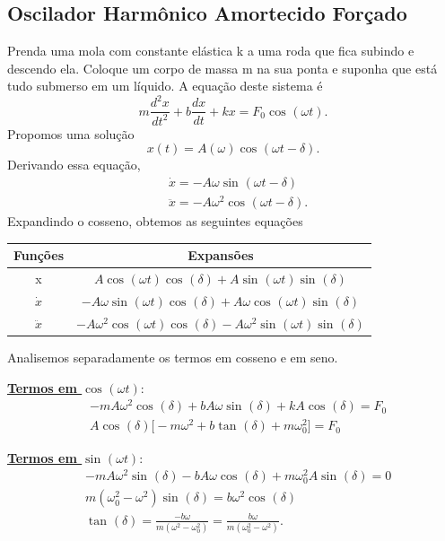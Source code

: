 \documentclass{article}
\begin{document}
\subsection{Oscilador Harmônico Amortecido Forçado}
Prenda uma mola com constante elástica k a uma roda que fica subindo e descendo ela. Coloque um corpo de massa m na sua ponta e 
suponha que está tudo submerso em um líquido. A equação deste sistema é 
\[
  m \frac{d^{2}x}{dt^{2}} + b \frac{dx}{dt} + kx = F_{0}\cos^{}{(\omega t)}.
\]
Propomos uma solução 
\[
  x(t) = A(\omega ) \cos^{}{(\omega t - \delta )}.
\]
Derivando essa equação, 
\begin{align*}
   &\dot x = -A\omega \sin^{}{(\omega t - \delta )}\\
   &\ddot x = -A\omega ^{2}\cos^{}{(\omega t - \delta )}.
\end{align*}
Expandindo o cosseno, obtemos as seguintes equações
\begin{center}
  \begin{table}[h]
    \centering
    \begin{tabular}{| c | c |}
      \hline 
      Funções & Expansões\\
      \hline
      x & \(A\cos^{}{(\omega t )}\cos^{}{(\delta )} + A \sin^{}{(\omega t)}\sin^{}{(\delta )}\)\\
      \(\dot x\) & \(-A\omega \sin^{}{(\omega t)}\cos^{}{(\delta )} + A\omega \cos^{}{(\omega t)}\sin^{}{(\delta )}\)\\
      \(\ddot x\) & \(-A\omega^{2}\cos^{}{(\omega t)}\cos^{}{(\delta )} - A\omega ^{2}\sin^{}{(\omega t)}\sin^{}{(\delta )}\)\\
      \hline
    \end{tabular}
  \end{table}
\end{center}

Analisemos separadamente os termos em cosseno e em seno.

\underline{\textbf{Termos em \(\cos^{}{(\omega t)}\)}}:
\begin{align*}
  &-mA\omega ^{2}\cos^{}{(\delta )} + b A\omega \sin^{}{(\delta )} + kA \cos^{}{(\delta )} = F_{0}\\
  &A\cos^{}{(\delta )}\biggl[-m\omega ^{2} + b \tan^{}{(\delta )} + m\omega_{0}^{2}\biggr] = F_{0}
\end{align*}

\underline{\textbf{Termos em \(\sin^{}{(\omega t)}\)}}:
\begin{align*}
  &-mA\omega ^{2}\sin^{}{(\delta )} - bA\omega\cos^{}{(\delta )} + m\omega_{0}^{2}A\sin^{}{(\delta )} = 0\\
  &m(\omega_{0}^{2}-\omega ^{2})\sin^{}{(\delta )}=b\omega^{2}\cos^{}{(\delta )}\\
  &\tan^{}{(\delta )}=\frac{-b\omega}{m(\omega ^{2}-\omega_{0}^{2})} = \frac{b\omega}{m(\omega_{0}^{2}-\omega ^{2})}.
\end{align*}
\end{document}
